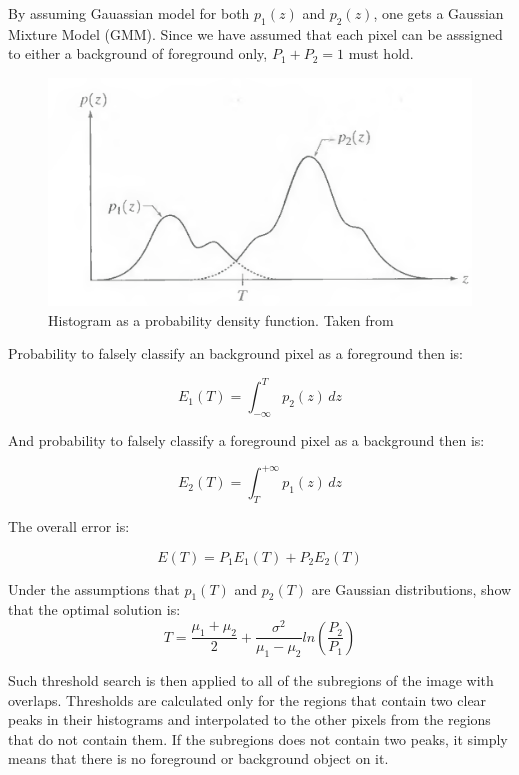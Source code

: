 By assuming Gauassian model for both $p_1(z)$ and $p_2(z)$, one gets a Gaussian Mixture Model (GMM). Since we have assumed that each pixel can be asssigned to either a background of foreground only, $P_1 + P_2 = 1$ must hold. 

\begin{figure}[htb]
	\begin{center}
		\includegraphics[width=0.8\linewidth]{bilder/Gonzalez.png}
		\caption[Histogram as a probability density function]%
        {Histogram as a probability density function. Taken from \cite{digital_image_book}}\label{fig:gmm}
	\end{center}
\end{figure}

Probability to falsely classify an background pixel as a foreground then is:

\begin{equation}
    E_1(T) = \int_{-\infty}^T{p_2(z) \, dz}
\end{equation}

And probability to falsely classify a foreground pixel as a background then is:

\begin{equation}
    E_2(T) = \int_T^{+\infty}{p_1(z) \, dz}
\end{equation}

The overall error is:

\begin{equation}
    E(T) = P_1E_1(T) + P_2E_2(T)
\end{equation}

Under the assumptions that $p_1(T)$ and $p_2(T)$ are Gaussian distributions, \cite{digital_image_book} show that the optimal solution is:
\begin{equation}
    T = \frac{\mu_1 + \mu_2}{2} + \frac{\sigma^2}{\mu_1 - \mu_2}ln\left(\frac{P_2}{P_1}\right)
\end{equation}

Such threshold search is then applied to all of the subregions of the image with overlaps. Thresholds are calculated only for the regions that contain two clear peaks in their histograms and interpolated to the other pixels from the regions that do not contain them. If the subregions does not contain two peaks, it simply means that there is no foreground or background object on it. 

